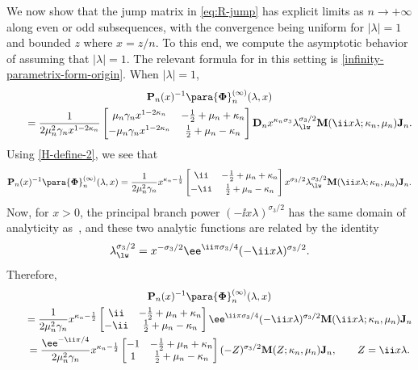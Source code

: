 We now show that the jump matrix in \eqref{eq:R-jump} has explicit limits as $n\to +\infty$ along even or odd subsequences, with the convergence being uniform for $|\lambda|=1$ and bounded $z$ where $x=z/n$. To this end, we compute the asymptotic behavior of  assuming that $|\lambda|=1$. The relevant formula for  in this setting is \eqref{infinity-parametrix-form-origin}.
When $|\lambda|=1$,
\begin{gather*}
 \mathbf{P}_n(x)^{-1}\para{\mathbf{\Phi}}_n^{(\infty)}(\lambda,x)\\
 \qquad=\frac{1}{2\mu_n^2\gamma_nx^{1-2\kappa_n}}\begin{bmatrix}\mu_n\gamma_nx^{1-2\kappa_n} & -\frac{1}{2}+\mu_n+\kappa_n \vspace{1mm}\\-\mu_n\gamma_nx^{1-2\kappa_n} & \frac{1}{2}+\mu_n-\kappa_n\end{bmatrix}\mathbf{D}_nx^{\kappa_n\sigma_3}\lambda_{\lw}^{\sigma_3/2}\mathbf{M}(\ii x\lambda;\kappa_n,\mu_n)\mathbf{J}_n.
\end{gather*}
Using \eqref{H-define-2}, we see that
\begin{equation*}
 \mathbf{P}_n(x)^{-1}\para{\mathbf{\Phi}}_n^{(\infty)}(\lambda,x)=\frac{1}{2\mu_n^2 \gamma_n}x^{\kappa_n-\frac{1}{2}}\begin{bmatrix}
 \ii & -\frac{1}{2} + \mu_n+\kappa_n \vspace{1mm}\\-\ii & \frac{1}{2} + \mu_n-\kappa_n\end{bmatrix}x^{\sigma_3/2}\lambda_{\lw}^{\sigma_3/2}\mathbf{M}(\ii x\lambda;\kappa_n,\mu_n)\mathbf{J}_n.
\end{equation*}
Now, for $x>0$, the principal branch power $(-\ii x\lambda)^{\sigma_3/2}$ has the same domain of analyticity as~, and these two analytic functions are related by the identity \[\lambda_{\lw}^{\sigma_3/2}=x^{-\sigma_3/2}\ee^{\ii\pi\sigma_3/4}(-\ii x\lambda)^{\sigma_3/2}.\] Therefore,
\begin{gather}
 \mathbf{P}_n(x)^{-1}\para{\mathbf{\Phi}}_n^{(\infty)}(\lambda,x)\nonumber\\
 \qquad =\frac{1}{2\mu_n^2 \gamma_n}x^{\kappa_n-\frac{1}{2}}\begin{bmatrix}
 \ii & -\frac{1}{2} + \mu_n+\kappa_n \\-\ii & \frac{1}{2} + \mu_n-\kappa_n\end{bmatrix}\ee^{\ii\pi\sigma_3/4}(-\ii x\lambda)^{\sigma_3/2}\mathbf{M}(\ii x\lambda;\kappa_n,\mu_n)\mathbf{J}_n\nonumber\\
 \qquad=\frac{\ee^{-\ii\pi/4}}{2 \mu_n^2 \gamma_n}x^{\kappa_n-\frac{1}{2}}\begin{bmatrix}-1 & -\frac{1}{2} + \mu_n +\kappa_n \\1 & \frac{1}{2} + \mu_n-\kappa_n\end{bmatrix}(-Z)^{\sigma_3/2}\mathbf{M}(Z;\kappa_n,\mu_n)\mathbf{J}_n,\qquad Z=\ii x\lambda.
\label{eq:Psi-infty-hat}
\end{gather}

